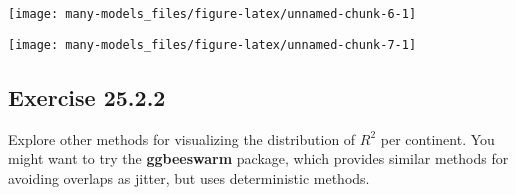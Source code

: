 \documentclass[]{book}
\newenvironment{Shaded}{\begin{snugshade}}{\end{snugshade}}
\newcommand{\CommentTok}[1]{\textcolor[rgb]{0.56,0.35,0.01}{\textit{#1}}}
\newcommand{\DataTypeTok}[1]{\textcolor[rgb]{0.13,0.29,0.53}{#1}}
\newcommand{\DecValTok}[1]{\textcolor[rgb]{0.00,0.00,0.81}{#1}}
\newcommand{\FloatTok}[1]{\textcolor[rgb]{0.00,0.00,0.81}{#1}}
\newcommand{\KeywordTok}[1]{\textcolor[rgb]{0.13,0.29,0.53}{\textbf{#1}}}
\newcommand{\NormalTok}[1]{#1}
\newcommand{\OperatorTok}[1]{\textcolor[rgb]{0.81,0.36,0.00}{\textbf{#1}}}
\newcommand{\OtherTok}[1]{\textcolor[rgb]{0.56,0.35,0.01}{#1}}
\newcommand{\StringTok}[1]{\textcolor[rgb]{0.31,0.60,0.02}{#1}}
\theoremstyle{plain}
\theoremstyle{remark}
\theoremstyle{definition}
\theoremstyle{definition}
\theoremstyle{definition}
\theoremstyle{remark}
\begin{document}
\begin{Shaded}
\end{Shaded}

\begin{center}\texttt{[image: many-models\_files/figure-latex/unnamed-chunk-6-1]} \end{center}

\begin{Shaded}
\end{Shaded}

\begin{center}\texttt{[image: many-models\_files/figure-latex/unnamed-chunk-7-1]} \end{center}

\hypertarget{exercise-25.2.2}{%
\subsection*{\texorpdfstring{Exercise
{25.2.2}}{Exercise 25.2.2}}\label{exercise-25.2.2}}

Explore other methods for visualizing the distribution of \(R^2\) per
continent. You might want to try the \textbf{ggbeeswarm} package, which
provides similar methods for avoiding overlaps as jitter, but uses
deterministic methods.
\end{document}
